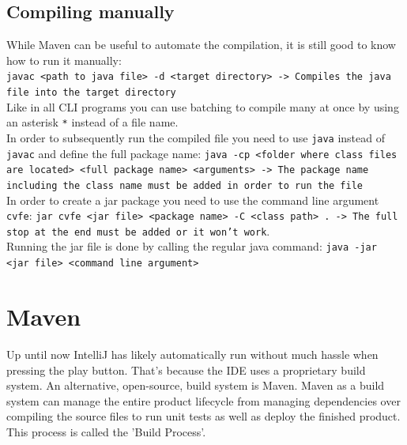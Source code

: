 \documentclass{article}
\begin{document}
	\subsection{Compiling manually}
	While Maven can be useful to automate the compilation, it is still good to know how to run it manually: \\
	\texttt{javac <path to java file> -d <target directory> -> Compiles the java file into the target directory} \\
	Like in all CLI programs you can use batching to compile many at once by using an asterisk \texttt{*} instead of a file name. \\
	In order to subsequently run the compiled file you need to use \texttt{java} instead of \texttt{javac} and define the full package name: \texttt{java -cp <folder where class files are located> <full package name> <arguments> -> The package name including the class name must be added in order to run the file} \\
	In order to create a jar package you need to use the command line argument \texttt{cvfe}: \texttt{jar cvfe <jar file> <package name> -C <class path> . -> The full stop at the end must be added or it won't work}. \\
	Running the jar file is done by calling the regular java command: \texttt{java -jar <jar file> <command line argument>}
	\section{Maven}
	Up until now IntelliJ has likely automatically run without much hassle when pressing the play button. That's because the IDE uses a proprietary build system. An alternative, open-source, build system is Maven. Maven as a build system can manage the entire product lifecycle from managing dependencies over compiling the source files to run unit tests as well as deploy the finished product. This process is called the 'Build Process'. 
\end{document}
